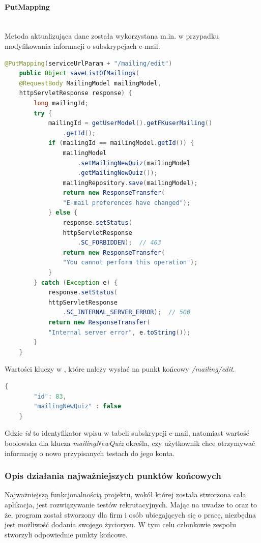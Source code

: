\documentclass[twoside]{projektInzynierskiMS}
\numberwithin{figure}{section}
\begin{document}
\paragraph{PutMapping}
\mbox{} \\ \indent
Metoda aktualizująca dane została wykorzystana m.in. w przypadku modyfikowania informacji o subskrypcjach e-mail.
\newpage
\begin{lstlisting}[language=Java,caption=Przykład użycia metody PUT. Źródło: Opracowanie własne.,captionpos=b]
    @PutMapping(serviceUrlParam + "/mailing/edit")
    public Object saveListOfMailings(
    @RequestBody MailingModel mailingModel,
    httpServletResponse response) {
        long mailingId;
        try {
            mailingId = getUserModel().getFKuserMailing()
                .getId();
            if (mailingId == mailingModel.getId()) {
                mailingModel
                    .setMailingNewQuiz(mailingModel
                    .getMailingNewQuiz());
                mailingRepository.save(mailingModel);
                return new ResponseTransfer(
                "E-mail preferences have changed");
            } else {
                response.setStatus(
                httpServletResponse
                    .SC_FORBIDDEN);  // 403
                return new ResponseTransfer(
                "You cannot perform this operation");
            }
        } catch (Exception e) {
            response.setStatus(
            httpServletResponse
                .SC_INTERNAL_SERVER_ERROR);  // 500
            return new ResponseTransfer(
            "Internal server error", e.toString());
        }
    }
\end{lstlisting}
\newpage
Wartości kluczy w \textit{\@RequestBody}, które należy wysłać na punkt końcowy \textit{/mailing/edit}.
\begin{lstlisting}[language=Java,caption=Przykładowa wartość klucza. Źródło: Opracowanie własne.,captionpos=b]
    {
        "id": 83,
        "mailingNewQuiz" : false
    }
\end{lstlisting}
Gdzie \textit{id} to identyfikator wpisu w tabeli subskrypcji e-mail, natomiast wartość boolowska dla klucza \textit{mailingNewQuiz} określa, czy użytkownik chce otrzymywać informację o nowo przypisanych testach do jego konta.

\subsubsection{Opis działania najważniejszych punktów końcowych}
Najważniejszą funkcjonalnością projektu, wokół której została stworzona cała aplikacja, jest rozwiązywanie testów rekrutacyjnych. Mając na uwadze to oraz to że, program został stworzony dla firm i osób ubiegających się o pracę, niezbędna jest możliwość dodania swojego życiorysu. W tym celu członkowie zespołu stworzyli odpowiednie punkty końcowe.
\end{document}
